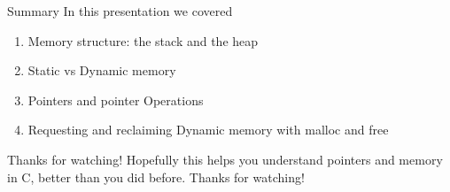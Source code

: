 \documentclass{beamer}
\begin{document}
\begin{frame}[fragile]{Summary} 
In this presentation we covered
\begin{enumerate}
	\item Memory structure: the stack and the heap
	\item Static vs Dynamic memory
	\item Pointers and pointer Operations
	\item Requesting and reclaiming Dynamic memory with malloc and free
\end{enumerate}
\end{frame}

\begin{frame}[fragile]{Thanks for watching!}
Hopefully this helps you understand pointers and memory in C, better than you did before. Thanks for watching!
\end{frame}
\end{document}
